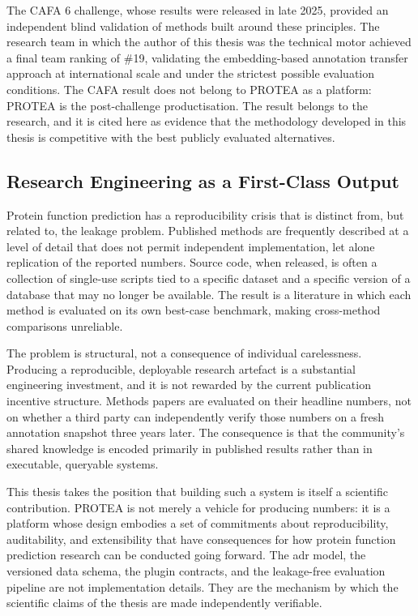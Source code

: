 The CAFA 6 challenge, whose results were released in late 2025, provided an
independent blind validation of methods built around these principles. The research
team in which the author of this thesis was the technical motor achieved a
final team ranking of \#19, validating the embedding-based annotation transfer approach at
international scale and under the strictest possible evaluation conditions. The CAFA
result does not belong to PROTEA as a platform: PROTEA is the post-challenge
productisation. The result belongs to the research, and it is cited here as evidence
that the methodology developed in this thesis is competitive with the best publicly
evaluated alternatives.

\subsection{Research Engineering as a First-Class Output}
\label{subsec:research-engineering}

Protein function prediction has a reproducibility crisis that is distinct from, but
related to, the leakage problem. Published methods are frequently described at a level
of detail that does not permit independent implementation, let alone replication of
the reported numbers. Source code, when released, is often a collection of
single-use scripts tied to a specific dataset and a specific version of a database
that may no longer be available. The result is a literature in which each method is
evaluated on its own best-case benchmark, making cross-method comparisons unreliable.

The problem is structural, not a consequence of individual carelessness. Producing a
reproducible, deployable research artefact is a substantial engineering investment,
and it is not rewarded by the current publication incentive structure. Methods papers
are evaluated on their headline numbers, not on whether a third party can independently
verify those numbers on a fresh annotation snapshot three years later. The consequence
is that the community's shared knowledge is encoded primarily in published results
rather than in executable, queryable systems.

This thesis takes the position that building such a system is itself a scientific
contribution. PROTEA is not merely a vehicle for producing numbers: it is a platform
whose design embodies a set of commitments about reproducibility, auditability, and
extensibility that have consequences for how protein function prediction research can
be conducted going forward. The \gls{adr} model, the versioned data schema, the plugin
contracts, and the leakage-free evaluation pipeline are not implementation details.
They are the mechanism by which the scientific claims of the thesis are made
independently verifiable.

